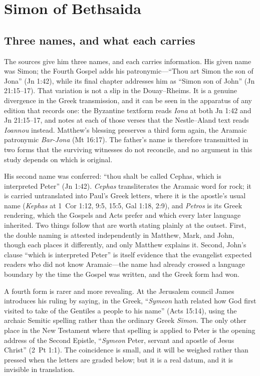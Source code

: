 \section{Simon of Bethsaida}

\subsection{Three names, and what each carries}

The sources give him three names, and each carries information. His given
name was Simon; the Fourth Gospel adds his patronymic---``Thou art Simon the
son of Jona'' (Jn 1:42), while its final chapter addresses him as ``Simon son
of John'' (Jn 21:15--17). That variation is not a slip in the Douay--Rheims.
It is a genuine divergence in the Greek transmission, and it can be seen in
the apparatus of any edition that records one: the Byzantine textform reads
\textit{Iona} at both Jn 1:42 and Jn 21:15--17, and notes at each of those
verses that the Nestle--Aland text reads \textit{Ioannou} instead. Matthew's
blessing preserves a third form again, the Aramaic patronymic
\textit{Bar-Jona} (Mt 16:17). The father's name is therefore transmitted in
two forms that the surviving witnesses do not reconcile, and no argument in
this study depends on which is original.

His second name was conferred: ``thou shalt be called Cephas, which is
interpreted Peter'' (Jn 1:42). \textit{Cephas} transliterates the Aramaic
word for rock; it is carried untranslated into Paul's Greek letters, where it
is the apostle's usual name (\textit{Kephas} at 1~Cor 1:12, 9:5, 15:5,
Gal 1:18, 2:9), and \textit{Petros} is its Greek rendering, which the Gospels
and Acts prefer and which every later language inherited. Two things follow
that are worth stating plainly at the outset. First, the double naming is
attested independently in Matthew, Mark, and John, though each places it
differently, and only Matthew explains it. Second, John's clause ``which is
interpreted Peter'' is itself evidence that the evangelist expected readers
who did not know Aramaic---the name had already crossed a language boundary
by the time the Gospel was written, and the Greek form had won.

A fourth form is rarer and more revealing. At the Jerusalem council James
introduces his ruling by saying, in the Greek, ``\textit{Symeon} hath related
how God first visited to take of the Gentiles a people to his name''
(Acts 15:14), using the archaic Semitic spelling rather than the ordinary
Greek \textit{Simon}. The only other place in the New Testament where that
spelling is applied to Peter is the opening address of the Second Epistle,
``\textit{Symeon} Peter, servant and apostle of Jesus Christ'' (2~Pt 1:1).
The coincidence is small, and it will be weighed rather than pressed when the
letters are graded below; but it is a real datum, and it is invisible in
translation.

